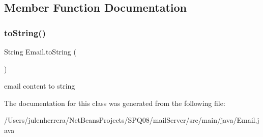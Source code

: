 \subsection{Member Function Documentation}
\mbox{\label{class_email_ada3a942a6a2471322bf1fa6ab44e0dbd}} 
\subsubsection{\texorpdfstring{to\+String()}{toString()}}
{\footnotesize\ttfamily String Email.\+to\+String (\begin{DoxyParamCaption}{ }\end{DoxyParamCaption})}

email content to string 

The documentation for this class was generated from the following file\+:\begin{DoxyCompactItemize}
\item 
/\+Users/julenherrera/\+Net\+Beans\+Projects/\+S\+P\+Q08/mail\+Server/src/main/java/Email.\+java\end{DoxyCompactItemize}
